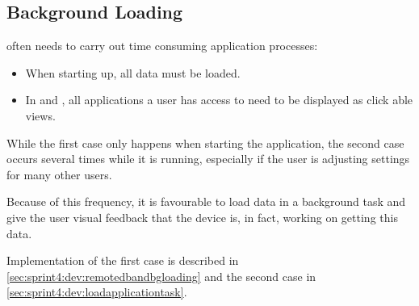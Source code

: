 \subsection{Background Loading}

\launcher often needs to carry out time consuming application processes:

\begin{itemize}
\item When starting up, all data must be loaded.
\item In \homeactivity and \settingsactivity, all applications a user has access to need to be displayed as click able views.
\end{itemize}

While the first case only happens when starting the application, the second case occurs several times while it is running, especially if the user is adjusting settings for many other users.

Because of this frequency, it is favourable to load data in a background task and give the user visual feedback that the device is,  in fact, working on getting this data.

Implementation of the first case is described in \cref{sec:sprint4:dev:remotedbandbgloading} and the second case in \cref{sec:sprint4:dev:loadapplicationtask}.
